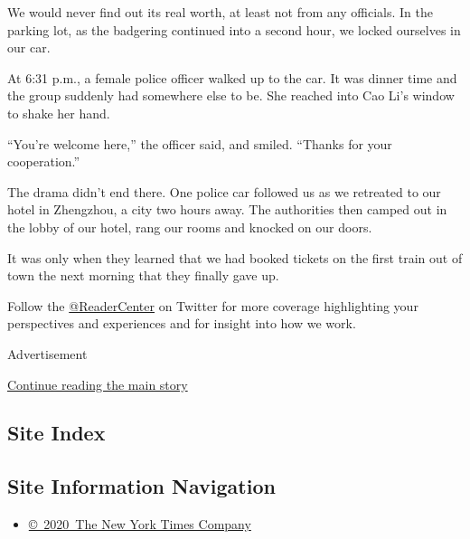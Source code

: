 We would never find out its real worth, at least not from any officials.
In the parking lot, as the badgering continued into a second hour, we
locked ourselves in our car.

At 6:31 p.m., a female police officer walked up to the car. It was
dinner time and the group suddenly had somewhere else to be. She reached
into Cao Li's window to shake her hand.

``You're welcome here,'' the officer said, and smiled. ``Thanks for your
cooperation.''

The drama didn't end there. One police car followed us as we retreated
to our hotel in Zhengzhou, a city two hours away. The authorities then
camped out in the lobby of our hotel, rang our rooms and knocked on our
doors.

It was only when they learned that we had booked tickets on the first
train out of town the next morning that they finally gave up.

Follow the \href{https://twitter.com/readercenter}{@ReaderCenter} on
Twitter for more coverage highlighting your perspectives and experiences
and for insight into how we work.

Advertisement

\protect\hyperlink{after-bottom}{Continue reading the main story}

\hypertarget{site-index}{%
\subsection{Site Index}\label{site-index}}

\hypertarget{site-information-navigation}{%
\subsection{Site Information
Navigation}\label{site-information-navigation}}

\begin{itemize}
\tightlist
\item
  \href{https://help.nytimes3xbfgragh.onion/hc/en-us/articles/115014792127-Copyright-notice}{©~2020~The
  New York Times Company}
\end{itemize}

